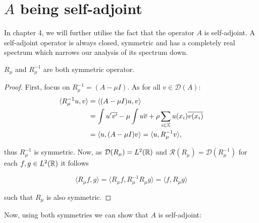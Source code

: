 \section{$A$ being self-adjoint}

In chapter 4, we will further utilise the fact that the operator $A$ is self-adjoint. A self-adjoint operator is always closed, symmetric and has a completely real spectrum which narrows our analysis of its spectrum down. 

\begin{theorem} \label{2.2:thm-RmuSymmetric}
	$R_{\mu}$ and $R_{\mu}^{-1}$ are both symmetric operator.
	
	\begin{proof}
		First, focus on $R_{\mu}^{-1} = (A - \mu I)$. As for all $v \in \mathcal{D}(A)$:
			\begin{align*}
				\langle R_{\mu}^{-1} u, v \rangle & = \langle (A - \mu I) u, v \rangle \\
					& = \int u'\overline{v'} -  \mu \int u \overline{v} + \rho \sum_{i \in \mathbb{Z}} u(x_{i}) \overline{v(x_{i})} \\
					& = \langle u, (A - \mu I) v \rangle = \langle u,  R_{\mu}^{-1} v \rangle,
			\end{align*}

		thus $R_{\mu}^{-1}$ is symmetric. Now, as $\mathcal{D}(R_{\mu}) = L^{2}(\mathbb{R})$ and $\mathcal{R}(R_{\mu}) = \mathcal{D}(R_{\mu}^{-1})$ for each $f, g \in L^{2}(\mathbb{R})$ it follows
		
		\[  \langle R_{\mu} f, g \rangle =  \langle R_{\mu} f, R_{\mu}^{-1} R_{\mu} g \rangle = \langle f, R_{\mu} g \rangle \]
		
		such that $R_{\mu}$ is also symmetric.
	\end{proof}
\end{theorem}

Now, using both symmetries we can show that $A$ is self-adjoint:

